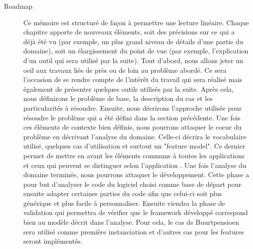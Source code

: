 \begin{description}
\item[Roadmap] 

Ce mémoire est structuré de façon à permettre une lecture linéaire.  Chaque chapitre apporte de nouveaux éléments,  soit des précisions sur ce qui a déjà été vu (par exemple,  un plus grand niveau de détails d'une partie du domaine),  soit un élargissement du point de vue (par exemple,  l'explication d'un outil qui sera utilisé par la suite).  Tout d'abord,  nous allons jeter un oeil aux travaux liés de près ou de loin au problème abordé.  Ce sera l'occasion de se rendre compte de l'intérêt du travail qui sera réalisé mais également de présenter quelques outils utilisés par la suite.  Après cela,  nous définirons le problème de base,  la description du cas et les particularités à résoudre.  Ensuite,  nous décrirons l'approche utilisée pour résoudre le problème qui a été défini dans la section précédente.  Une fois ces éléments de contexte bien définis,  nous pourrons attaquer le coeur du problème en décrivant l'analyse du domaine.  Celle-ci décrira le vocabulaire utilisé,  quelques cas d'utilisation et surtout un "feature model".  Ce dernier permet de mettre en avant les éléments communs à toutes les applications et ceux qui peuvent se distinguer selon l'application \cite{GenProg}.  Une fois l'analyse du domaine terminée,  nous pourrons attaquer le développement.  Cette phase a pour but d'analyser le code du logiciel choisi comme base de départ pour ensuite adapter certaines parties du code afin que celui-ci soit plus générique et plus facile à personnaliser.  Ensuite viendra la phase de validation qui permettra de vérifier que le framework développé correspond bien au modèle décrit dans l'analyse.  Pour cela,  le cas de Buurtpensioen sera utilisé comme première instanciation et d'autres cas pour les features seront implémentés.

\end{description}